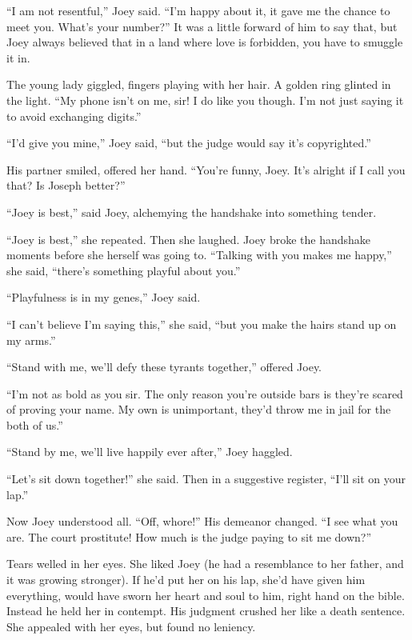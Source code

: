 \documentclass[oneside]{book}
\begin{document}
``I am not resentful,'' Joey said.  ``I'm happy about it, it gave me the chance
to meet you.  What's your number?''
It was a little forward of him to say that, but
Joey always believed that in a land where love is
forbidden, you have to smuggle it in.

The young lady giggled, fingers playing with her hair.  A golden ring glinted in
the light.  ``My phone isn't on me, sir!
I do like you though.  I'm not just saying it to avoid exchanging digits.''

``I'd give you mine,'' Joey said, ``but the judge would say it's copyrighted.''

His partner smiled, offered her hand.  ``You're funny, Joey.  It's alright if I call you that?
Is Joseph better?''

``Joey is best,'' said Joey, alchemying the handshake into something tender.

``Joey is best,'' she repeated.  Then she laughed.
Joey broke the handshake moments before she herself was going to.
``Talking with you makes me happy,'' she said,
``there's something playful about you.''

``Playfulness is in my genes,'' Joey said.

``I can't believe I'm saying this,'' she said, ``but you make the hairs stand up on
my arms.''

``Stand with me, we'll defy these tyrants together,'' offered Joey.

``I'm not as bold as you sir.  The only reason you're outside bars
is they're scared of proving your name.  My own is unimportant, they'd throw me in
jail for the both of us.''

``Stand by me, we'll live happily ever after,'' Joey haggled.

``Let's sit down together!'' she said.
Then in a suggestive register, ``I'll sit on your lap.''

Now Joey understood all.
``Off, whore!''  His demeanor changed.  ``I see what you are.
The court prostitute!  How much is the judge paying to sit me down?''

Tears welled in her eyes.
She liked Joey (he had a resemblance to her father, and it was growing stronger).
If he'd put her on his lap,
she'd have given him everything, would have sworn
her heart and soul to him, right hand on the bible.
Instead he held her in contempt.
His judgment crushed her like a death sentence.
She appealed with her eyes, but found no leniency.
\end{document}
